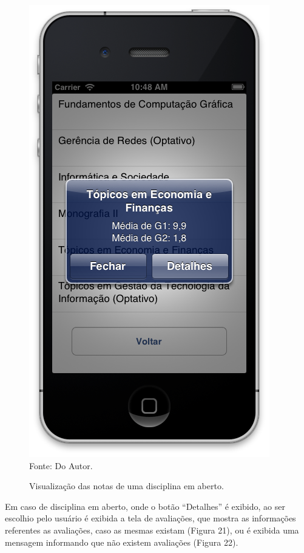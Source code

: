 \begin{figure}[!htb]
     \centering
     \caption[Formulário Notas da Graduação - Visualização de Disciplina Aberta]{Visualização das notas de uma disciplina em aberto.}
     \includegraphics[scale=0.34]{imagens/formvisualizacaomediascomdetalhes.png}
     \\  Fonte: Do Autor.
\end{figure}
\newpage

Em caso de disciplina em aberto, onde o botão ``Detalhes'' é exibido, ao ser escolhio pelo usuário é exibida a tela de avaliações, que mostra as informações referentes as avaliações, caso as mesmas existam (Figura 21), ou é exibida uma mensagem informando que não existem avaliações (Figura 22).

